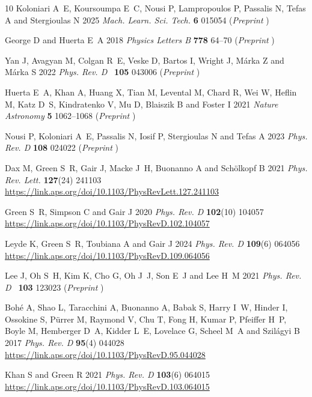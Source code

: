 \documentclass[12pt]{iopart}
\def\prd{{\it Phys. Rev.} D~}
\begin{document}
\begin{thebibliography}{10}
Koloniari A~E, Koursoumpa E~C, Nousi P, Lampropoulos P, Passalis N, Tefas A and
  Stergioulas N 2025 {\em Mach. Learn. Sci. Tech.\/} {\bf 6} 015054
  (\textit{Preprint} )

{George} D and {Huerta} E~A 2018 {\em Physics Letters B\/} {\bf 778} 64--70
  (\textit{Preprint} )

{Yan} J, {Avagyan} M, {Colgan} R~E, {Veske} D, {Bartos} I, {Wright} J,
  {M{\'a}rka} Z and {M{\'a}rka} S 2022 {\em \prd\/} {\bf 105} 043006
  (\textit{Preprint} )

{Huerta} E~A, {Khan} A, {Huang} X, {Tian} M, {Levental} M, {Chard} R, {Wei} W,
  {Heflin} M, {Katz} D~S, {Kindratenko} V, {Mu} D, {Blaiszik} B and {Foster} I
  2021 {\em Nature Astronomy\/} {\bf 5} 1062--1068 (\textit{Preprint}
  )

Nousi P, Koloniari A~E, Passalis N, Iosif P, Stergioulas N and Tefas A 2023
  {\em Phys. Rev. D\/} {\bf 108} 024022 (\textit{Preprint} )

Dax M, Green S~R, Gair J, Macke J~H, Buonanno A and Sch\"olkopf B 2021 {\em
  Phys. Rev. Lett.\/} {\bf 127}(24) 241103
  \urlprefix\url{https://link.aps.org/doi/10.1103/PhysRevLett.127.241103}

Green S~R, Simpson C and Gair J 2020 {\em Phys. Rev. D\/} {\bf 102}(10) 104057
  \urlprefix\url{https://link.aps.org/doi/10.1103/PhysRevD.102.104057}

Leyde K, Green S~R, Toubiana A and Gair J 2024 {\em Phys. Rev. D\/} {\bf
  109}(6) 064056
  \urlprefix\url{https://link.aps.org/doi/10.1103/PhysRevD.109.064056}

{Lee} J, {Oh} S~H, {Kim} K, {Cho} G, {Oh} J~J, {Son} E~J and {Lee} H~M 2021
  {\em \prd\/} {\bf 103} 123023 (\textit{Preprint} )

Boh\'e A, Shao L, Taracchini A, Buonanno A, Babak S, Harry I~W, Hinder I,
  Ossokine S, P\"urrer M, Raymond V, Chu T, Fong H, Kumar P, Pfeiffer H~P,
  Boyle M, Hemberger D~A, Kidder L~E, Lovelace G, Scheel M~A and Szil\'agyi B
  2017 {\em Phys. Rev. D\/} {\bf 95}(4) 044028
  \urlprefix\url{https://link.aps.org/doi/10.1103/PhysRevD.95.044028}

Khan S and Green R 2021 {\em Phys. Rev. D\/} {\bf 103}(6) 064015
  \urlprefix\url{https://link.aps.org/doi/10.1103/PhysRevD.103.064015}


\end{thebibliography}
\end{document}

